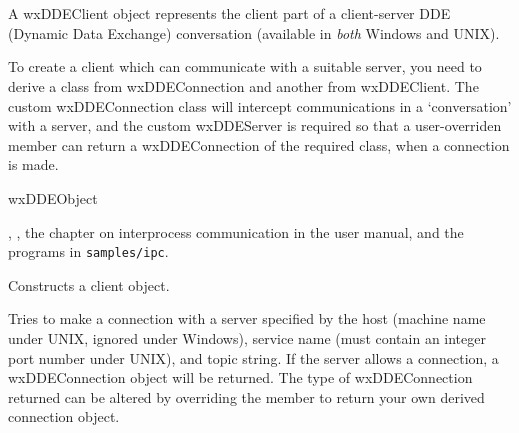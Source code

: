 \section{}\label{wxddeclient}


A wxDDEClient object represents the client part of a client-server DDE
(Dynamic Data Exchange) conversation (available in {\it both}\/
Windows and UNIX).

To create a client which can communicate with a suitable server,
you need to derive a class from wxDDEConnection and another from wxDDEClient.
The custom wxDDEConnection class will intercept communications in
a `conversation' with a server, and the custom wxDDEServer is required
so that a user-overriden  member can return
a wxDDEConnection of the required class, when a connection is made.


wxDDEObject


, ,
the chapter on interprocess communication in the user manual, and
the programs in {\tt samples/ipc}.




Constructs a client object.

\label{wxddeclientmakeconnection}


Tries to make a connection with a server specified by the host
(machine name under UNIX, ignored under Windows), service name (must
contain an integer port number under UNIX), and topic string. If the
server allows a connection, a wxDDEConnection object will be returned.
The type of wxDDEConnection returned can be altered by overriding
the  member to return your own
derived connection object.

\label{wxddeclientonmakeconnection}

